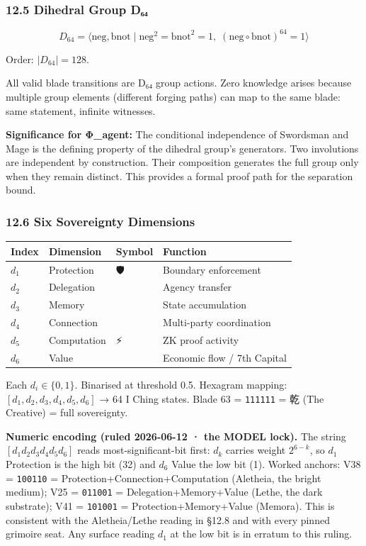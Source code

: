 \documentclass[
]{article}
\newcounter{none} %
\begin{document}
\subsubsection{12.5 Dihedral Group
D₆₄}\label{dihedral-group-dux2086ux2084}

\[D_{64} = \langle \text{neg}, \text{bnot} \mid \text{neg}^2 = \text{bnot}^2 = 1,\; (\text{neg} \circ \text{bnot})^{64} = 1 \rangle\]

Order: \(|D_{64}| = 128\).

All valid blade transitions are D₆₄ group actions. Zero knowledge arises
because multiple group elements (different forging paths) can map to the
same blade: same statement, infinite witnesses.

\textbf{Significance for Φ\_agent:} The conditional independence of
Swordsman and Mage is the defining property of the dihedral group's
generators. Two involutions are independent by construction. Their
composition generates the full group only when they remain distinct.
This provides a formal proof path for the separation bound.

\subsubsection{12.6 Six Sovereignty
Dimensions}\label{six-sovereignty-dimensions}

{\def\LTcaptype{none} %
\begin{longtable}[]{@{}llll@{}}
\toprule\noalign{}
Index & Dimension & Symbol & Function \\
\midrule\noalign{}
\endhead
\bottomrule\noalign{}
\endlastfoot
\(d_1\) & Protection & 🛡️ & Boundary enforcement \\
\(d_2\) & Delegation & 🤝 & Agency transfer \\
\(d_3\) & Memory & 📜 & State accumulation \\
\(d_4\) & Connection & 🔗 & Multi-party coordination \\
\(d_5\) & Computation & ⚡ & ZK proof activity \\
\(d_6\) & Value & 💎 & Economic flow / 7th Capital \\
\end{longtable}
}

Each \(d_i \in \{0, 1\}\). Binarised at threshold 0.5. Hexagram mapping:
\([d_1, d_2, d_3, d_4, d_5, d_6]\) → 64 I Ching states. Blade 63 =
\texttt{111111} = 乾 (The Creative) = full sovereignty.

\textbf{Numeric encoding (ruled 2026-06-12 · the MODEL lock).} The
string \([d_1 d_2 d_3 d_4 d_5 d_6]\) reads most-significant-bit first:
\(d_k\) carries weight \(2^{6-k}\), so \(d_1\) Protection is the high
bit (32) and \(d_6\) Value the low bit (1). Worked anchors: V38 =
\texttt{100110} = Protection+Connection+Computation (Aletheia, the
bright medium); V25 = \texttt{011001} = Delegation+Memory+Value (Lethe,
the dark substrate); V41 = \texttt{101001} = Protection+Memory+Value
(Memora). This is consistent with the Aletheia/Lethe reading in §12.8
and with every pinned grimoire seat. Any surface reading \(d_1\) at the
low bit is in erratum to this ruling.
\end{document}

